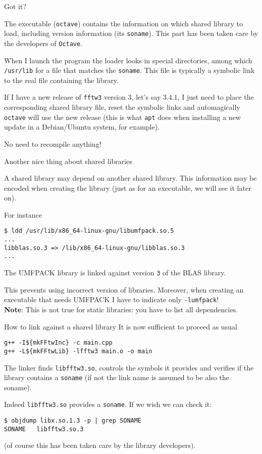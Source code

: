 \documentclass[10pt]{beamer}
\begin{document}
\begin{frame}{Got it?}  

  The executable (\texttt{octave}) contains the
  information on which shared library to load, including version
  information (its \texttt{soname}). This part has been taken care by the 
  developers of \texttt{Octave}.
  \smallskip

  When I launch the program the loader looks in special directories,
  among which \texttt{/usr/lib} for a file that matches the
  \texttt{soname}. This file is typically a symbolic link to the real
  file containing the library.  
  \medskip

  If I have a new release of \texttt{fftw3} version 3, let's say $3.4.1$,
  I just need to place the corresponding shared library file, reset the symbolic links and automagically \texttt{octave}
  will use the new release (this is what \texttt{apt} does when
  installing a new update in a Debian/Ubuntu system, for example).

  \smallskip

  No need to recompile anything!
\end{frame}


\begin{frame}[fragile]{Another nice thing about shared libraries} 

  A shared library may depend on another shared library. This information may be encoded  when creating the library
  (just as for an executable, we will see it later on).

  For instance
\begin{verbatim}
$ ldd /usr/lib/x86_64-linux-gnu/libumfpack.so.5
...
libblas.so.3 => /lib/x86_64-linux-gnu/libblas.so.3
...
\end{verbatim}
The UMFPACK library is linked against version
\texttt{3} of the BLAS library. \smallskip

This prevents using incorrect version of
libraries. Moreover, when creating an executable that needs UMFPACK I have to indicate only
\texttt{-lumfpack}! \\
\textbf{Note}: This is not true for static libraries: you have to list all dependencies.
\end{frame}

\begin{frame}[fragile]{How to link against a shared library}   
  It is now sufficient to proceed as usual
\begin{verbatim}
g++ -I${mkFFtwInc} -c main.cpp
g++ -L${mkFFtwLib} -lfftw3 main.o -o main
\end{verbatim}

The linker finds \texttt{libfftw3.so}, controls the symbols it
provides and verifies if the library contains a
\texttt{soname} (if not the link name is assumed to be also the
soname).

Indeed \texttt{libfftw3.so} provides a \texttt{soname}. If we wish we
can check it:
\begin{verbatim}
$ objdump libx.so.1.3 -p | grep SONAME
SONAME   libfftw3.so.3
\end{verbatim}
(of course this has been taken care by the library developers).
\end{frame}
\end{document}
